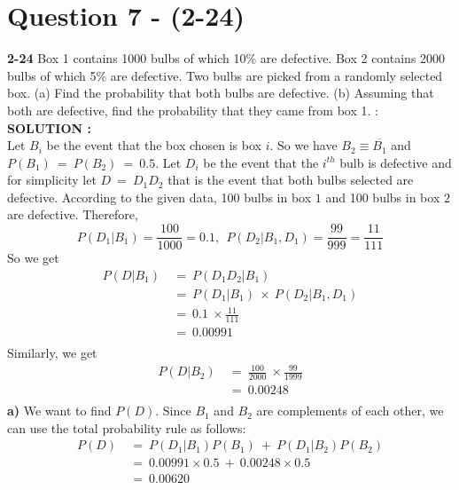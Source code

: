 \documentclass{article}
\begin{document}
\section{Question 7 - (2-24)}
\label{Q7}
\textbf{2-24}  Box 1 contains 1000 bulbs of which 10\% are defective. Box 2 contains 2000 bulbs of which 5\% are defective. Two bulbs are picked from a randomly selected box. (a) Find the probability that both bulbs are defective. (b) Assuming that both are defective, find the probability that they came from box 1.  : \\

\hspace{1em} \large{\textbf{SOLUTION :}} \\
Let $B_i$ be the event that the box chosen is box $i$. So we have $B_2 \equiv \overline{B_1}$ and $P(B_1)\ =\ P(B_2)\ =\ 0.5$. Let $D_i$ be the event that the $i^{th}$ bulb is defective and for simplicity let $D\ =\  D_1D_2$ that is the event that both bulbs selected are defective. According to the given data, 100 bulbs in box $1$ and 100 bulbs in box $2$ are defective. Therefore,
\begin{equation*}
    P(D_1|B_1)=\frac{100}{1000}= 0.1,\ \ P(D_2|B_1,D_1) = \frac{99}{999} = \frac{11}{111}
\end{equation*}
So we get
\begin{equation*}
    \begin{split}
        P(D|B_1)\ &=\ P(D_1 D_2|B_1)\\
                 &=\ P(D_1|B_1)\ \times\ P(D_2|B_1,D_1)\\
                 &=\ 0.1\ \times \frac{11}{111}\\
                 &=\ 0.00991\\
    \end{split}
\end{equation*}
Similarly, we get
\begin{equation*}
    \begin{split}
        P(D|B_2)\ &=\ \frac{100}{2000}\ \times \frac{99}{1999}\\
                  &=\ 0.00248\\
    \end{split}
\end{equation*}
\textbf{a)} We want to find $P(D)$. Since $B_1$ and $B_2$ are complements of each other, we can use the total probability rule as follows:
\begin{equation*}
    \begin{split}
        P(D)\ &=\ P(D_1|B_1)P(B_1)\ +\ P(D_1|B_2)P(B_2)\\
              &=\ 0.00991 \times 0.5\ +\ 0.00248 \times 0.5\\
              &=\ 0.00620
    \end{split} 
\end{equation*}
\end{document}
